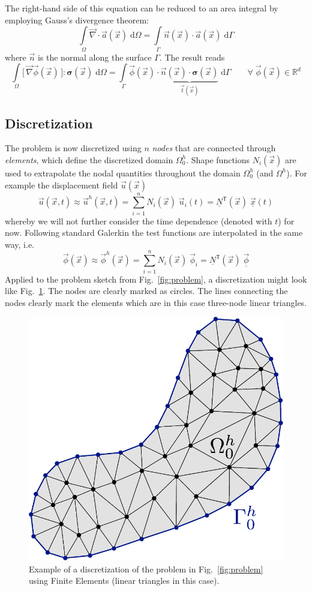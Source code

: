 \documentclass[times,namecite]{goose-article}
\begin{document}
The right-hand side of this equation can be reduced to an area integral by employing Gauss's divergence theorem:
\begin{equation}
  \int\limits_\Omega \vec{\nabla} \cdot \vec{a}(\vec{x}) \; \mathrm{d}\Omega
  =
  \int\limits_\Gamma \vec{n}(\vec{x}) \cdot \vec{a}(\vec{x}) \; \mathrm{d}\Gamma
\end{equation}
where $\vec{n}$ is the normal along the surface $\Gamma$. The result reads
\begin{equation}
  \int\limits_\Omega
    \big[\, \vec{\nabla} \vec{\phi}(\vec{x}) \,\big] : \bm{\sigma}(\vec{x}) \;
  \mathrm{d}\Omega
  =
  \int\limits_\Gamma
    \vec{\phi}(\vec{x}) \cdot
    \underbrace{
      \vec{n}(\vec{x}) \cdot \bm{\sigma}(\vec{x})
    }_{
      \vec{t}(\vec{x})
    } \;
  \mathrm{d}\Gamma
  \qquad
  \forall \; \vec{\phi}(\vec{x}) \in \mathbb{R}^d
\end{equation}

\subsection{Discretization}

The problem is now discretized using $n$ \emph{nodes} that are connected through \emph{elements}, which define the discretized domain $\Omega^h_0$. Shape functions $N_i(\vec{x})$ are used to extrapolate the nodal quantities throughout the domain $\Omega^h_0$ (and $\Omega^h$). For example the displacement field $\vec{u}(\vec{x})$
\begin{equation}
  \vec{u}(\vec{x},t)
  \approx
  \vec{u}^h(\vec{x},t)
  =
  \sum_{i=1}^{n} N_i (\vec{x}) \; \vec{u}_i (t)
  =
  \underline{N}^\mathsf{T} (\vec{x}) \; \underline{\vec{x}} (t)
\end{equation}
whereby we will not further consider the time dependence (denoted with $t$) for now. Following standard Galerkin the test functions are interpolated in the same way, i.e.\
\begin{equation}
  \vec{\phi}(\vec{x})
  \approx
  \vec{\phi}^h(\vec{x})
  =
  \sum_{i=1}^{n} N_i (\vec{x}) \; \vec{\phi}_i
  =
  \underline{N}^\mathsf{T} (\vec{x}) \; \underline{\vec{\phi}}
\end{equation}
Applied to the problem sketch from Fig.~\ref{fig:problem}, a discretization might look like Fig.~\ref{fig:problem:discretized}. The nodes are clearly marked as circles. The lines connecting the nodes clearly mark the elements which are in this case three-node linear triangles.

\begin{figure}[htp]
  \centering
  \includegraphics[width=.25\textwidth]{figures/problem-discretized.pdf}
  \caption{Example of a discretization of the problem in Fig.~\ref{fig:problem} using Finite Elements (linear triangles in this case).}
  \label{fig:problem:discretized}
\end{figure}
\end{document}
